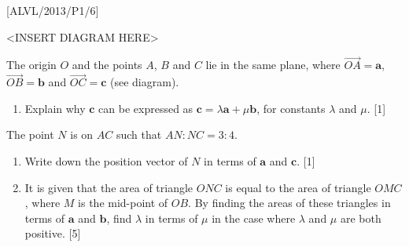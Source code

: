 \item {[}ALVL/2013/P1/6{]}
\noindent \begin{center}
<INSERT DIAGRAM HERE>
\par\end{center}

The origin $O$ and the points $A$, $B$ and $C$ lie in the same
plane, where $\vec{OA}=\mathbf{a}$, $\vec{OB}=\mathbf{b}$ and $\vec{OC}=\mathbf{c}$
(see diagram). 
\begin{enumerate}
\item Explain why $\mathbf{c}$ can be expressed as $\mathbf{c}=\lambda\mathbf{a}+\mu\mathbf{b}$,
for constants $\lambda$ and $\mu$. \hfill{}{[}1{]}
\end{enumerate}
The point $N$ is on $AC$ such that $AN:NC=3:4$. 
\begin{enumerate}
\item Write down the position vector of $N$ in terms of $\mathbf{a}$ and
$\mathbf{c}$. \hfill{} {[}1{]}
\item It is given that the area of triangle $ONC$ is equal to the area
of triangle $OMC$, where $M$ is the mid-point of $OB$. By finding
the areas of these triangles in terms of $\mathbf{a}$ and $\mathbf{b}$,
find $\lambda$ in terms of $\mu$ in the case where $\lambda$ and
$\mu$ are both positive. \hfill{}{[}5{]}
\end{enumerate}
